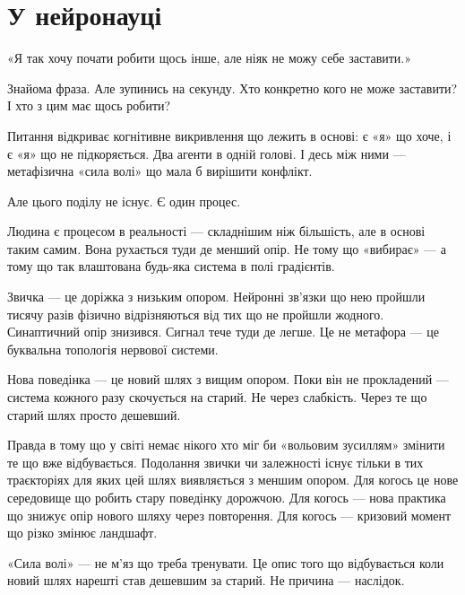 \documentclass[12pt, a4paper, openany]{book}
\begin{document}
\chapter{У нейронауці}

«Я так хочу почати робити щось інше, але ніяк не можу себе заставити.»

Знайома фраза. Але зупинись на секунду. Хто конкретно кого не може заставити? І хто з цим має щось робити?

Питання відкриває когнітивне викривлення що лежить в основі: є «я» що хоче, і є «я» що не підкоряється. Два агенти в одній голові. І десь між ними --- метафізична «сила волі» що мала б вирішити конфлікт.

Але цього поділу не існує. Є один процес.

Людина є процесом в реальності --- складнішим ніж більшість, але в основі таким самим. Вона рухається туди де менший опір. Не тому що «вибирає» --- а тому що так влаштована будь-яка система в полі градієнтів.

Звичка --- це доріжка з низьким опором. Нейронні зв'язки що нею пройшли тисячу разів фізично відрізняються від тих що не пройшли жодного. Синаптичний опір знизився. Сигнал тече туди де легше. Це не метафора --- це буквальна топологія нервової системи.

Нова поведінка --- це новий шлях з вищим опором. Поки він не прокладений --- система кожного разу скочується на старий. Не через слабкість. Через те що старий шлях просто дешевший.

Правда в тому що у світі немає нікого хто міг би «вольовим зусиллям» змінити те що вже відбувається. Подолання звички чи залежності існує тільки в тих траєкторіях для яких цей шлях виявляється з меншим опором. Для когось це нове середовище що робить стару поведінку дорожчою. Для когось --- нова практика що знижує опір нового шляху через повторення. Для когось --- кризовий момент що різко змінює ландшафт.

«Сила волі» --- не м'яз що треба тренувати. Це опис того що відбувається коли новий шлях нарешті став дешевшим за старий. Не причина --- наслідок.
\end{document}
